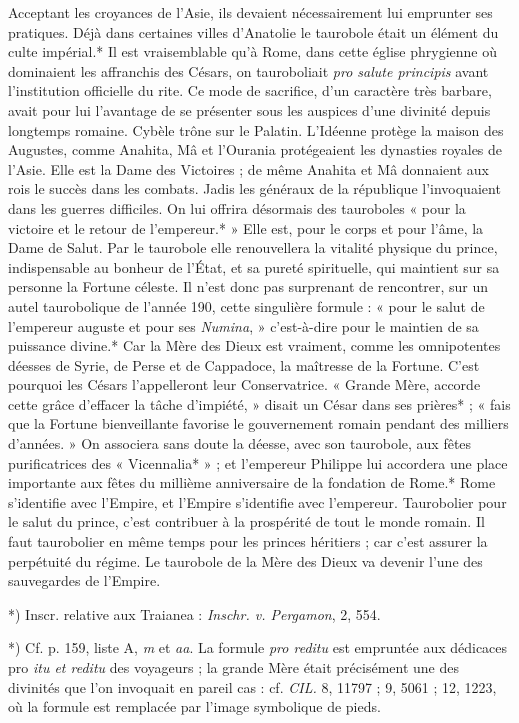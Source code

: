 \documentclass[a4paper, 11pt, oneside, polutonikogreek, french]{article}
\begin{document}
Acceptant les croyances de l'Asie, ils devaient nécessairement lui emprunter ses pratiques. Déjà dans certaines villes d'Anatolie le taurobole était un élément du culte impérial.* Il est vraisemblable qu'à Rome, dans cette église phrygienne où dominaient les affranchis des Césars, on tauroboliait \emph{pro salute principis} avant l'institution officielle du rite. Ce mode de sacrifice, d'un caractère très barbare, avait pour lui l'avantage de se présenter sous les auspices d'une divinité depuis longtemps romaine. Cybèle trône sur le Palatin. L'Idéenne protège la maison des Augustes, comme Anahita, Mâ et l'Ourania protégeaient les dynasties royales de l'Asie. Elle est la Dame des Victoires ; de même Anahita et Mâ donnaient aux rois le succès dans les combats. Jadis les généraux de la république l'invoquaient dans les guerres difficiles. On lui offrira désormais des tauroboles « pour la victoire et le retour de l'empereur.* » Elle est, pour le corps et pour l'âme, la Dame de Salut. Par le taurobole elle renouvellera la vitalité physique du prince, indispensable au bonheur de l'État, et sa pureté spirituelle, qui maintient sur sa personne la Fortune céleste. Il n'est donc pas surprenant de rencontrer, sur un autel taurobolique de l'année 190, cette singulière formule : « pour le salut de l'empereur auguste et pour ses \emph{Numina}, » c'est-à-dire pour le maintien de sa puissance divine.* Car la Mère des Dieux est vraiment, comme les omnipotentes déesses de Syrie, de Perse et de Cappadoce, la maîtresse de la Fortune. C'est pourquoi les Césars l'appelleront leur Conservatrice. « Grande Mère, accorde cette grâce d'effacer la tâche d'impiété, » disait un César dans ses prières* ; « fais que la Fortune bienveillante favorise le gouvernement romain pendant des milliers d'années. » On associera sans doute la déesse, avec son taurobole, aux fêtes purificatrices des « Vicennalia* » ; et l'empereur Philippe lui accordera une place importante aux fêtes du millième anniversaire de la fondation de Rome.* Rome s'identifie avec l'Empire, et l'Empire s'identifie avec l'empereur. Taurobolier pour le salut du prince, c'est contribuer à la prospérité de tout le monde romain. Il faut taurobolier en même temps pour les princes héritiers ; car c'est assurer la perpétuité du régime. Le taurobole de la Mère des Dieux va devenir l'une des sauvegardes de l'Empire.

*) Inscr. relative aux Traianea : \emph{Inschr. v. Pergamon}, 2, 554.

*) Cf. p. 159, liste A, \emph{m} et \emph{aa}. La formule \emph{pro reditu} est empruntée aux dédicaces pro \emph{itu et reditu} des voyageurs ; la grande Mère était précisément une des divinités que l'on invoquait en pareil cas : cf. \emph{CIL.} 8, 11797 ; 9, 5061 ; 12, 1223, où la formule est remplacée par l'image symbolique de pieds.
\end{document}
